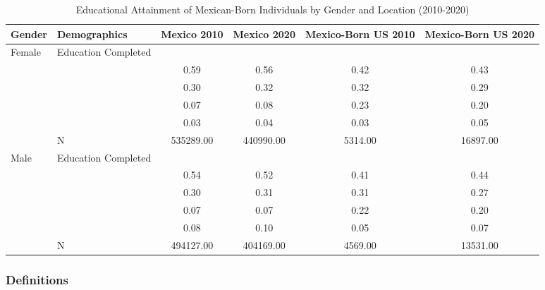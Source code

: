 \documentclass[
]{article}
\begin{document}
\begin{landscape}
\begin{table}[ht]
\centering
\caption{Educational Attainment of Mexican-Born Individuals by Gender and Location (2010-2020)} 
\begingroup\small
\begin{tabular}{l>{\raggedright\arraybackslash}p{3.2cm}|cccc}
  \hline
Gender & Demographics & Mexico 2010 & Mexico 2020 & Mexico-Born US 2010 & Mexico-Born US 2020 \\ 
  \hline
Female & Education Completed &  &  &  &  \\ 
   & \multicolumn{1}{>{\raggedleft\arraybackslash}p{3.2cm}|}{\makebox[3.2cm][r]{Less than Primary }} & 0.59 & 0.56 & 0.42 & 0.43 \\ 
   & \multicolumn{1}{>{\raggedleft\arraybackslash}p{1.7cm}|}{\makebox[1.7cm][r]{Primary }} & 0.30 & 0.32 & 0.32 & 0.29 \\ 
   & \multicolumn{1}{>{\raggedleft\arraybackslash}p{2cm}|}{\makebox[2cm][r]{Secondary }} & 0.07 & 0.08 & 0.23 & 0.20 \\ 
   & \multicolumn{1}{>{\raggedleft\arraybackslash}p{2cm}|}{\makebox[2cm][r]{University }} & 0.03 & 0.04 & 0.03 & 0.05 \\ 
   & N & 535289.00 & 440990.00 & 5314.00 & 16897.00 \\ 
  Male & Education Completed &  &  &  &  \\ 
   & \multicolumn{1}{>{\raggedleft\arraybackslash}p{3.2cm}|}{\makebox[3.2cm][r]{Less than Primary }} & 0.54 & 0.52 & 0.41 & 0.44 \\ 
   & \multicolumn{1}{>{\raggedleft\arraybackslash}p{1.7cm}|}{\makebox[1.7cm][r]{Primary }} & 0.30 & 0.31 & 0.31 & 0.27 \\ 
   & \multicolumn{1}{>{\raggedleft\arraybackslash}p{2cm}|}{\makebox[2cm][r]{Secondary }} & 0.07 & 0.07 & 0.22 & 0.20 \\ 
   & \multicolumn{1}{>{\raggedleft\arraybackslash}p{2cm}|}{\makebox[2cm][r]{University }} & 0.08 & 0.10 & 0.05 & 0.07 \\ 
   & N & 494127.00 & 404169.00 & 4569.00 & 13531.00 \\ 
   \hline
\end{tabular}
\endgroup
\end{table}

\end{landscape}

\newpage

\subsubsection{Definitions}\label{definitions}
\end{document}
